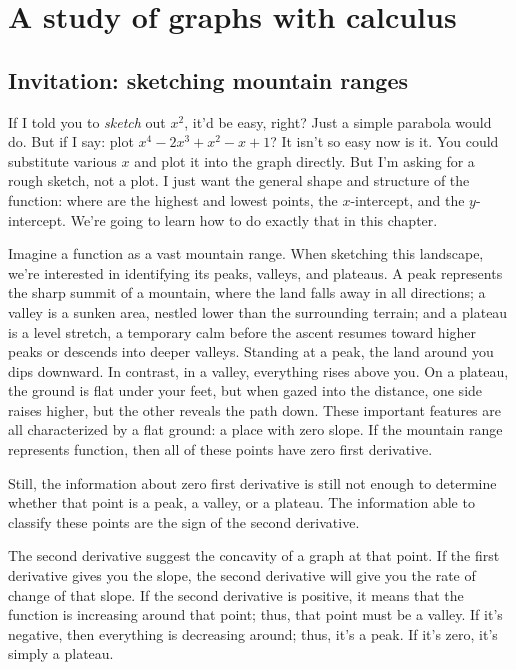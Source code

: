 \chapter{A study of graphs with calculus}

\section{Invitation: sketching mountain ranges}

If I told you to \emph{sketch} out $x^2$, it'd be easy, right? Just a simple parabola would do. But if I say: plot $x^4 - 2x^3 + x^2 - x + 1$? It isn't so easy now is it. You could substitute various $x$ and plot it into the graph directly. But I'm asking for a rough sketch, not a plot. I just want the general shape and structure of the function: where are the highest and lowest points, the $x$-intercept, and the $y$-intercept. We're going to learn how to do exactly that in this chapter.

Imagine a function as a vast mountain range. When sketching this landscape, we're interested in identifying its peaks, valleys, and plateaus. A peak represents the sharp summit of a mountain, where the land falls away in all directions; a valley is a sunken area, nestled lower than the surrounding terrain; and a plateau is a level stretch, a temporary calm before the ascent resumes toward higher peaks or descends into deeper valleys. Standing at a peak, the land around you dips downward. In contrast, in a valley, everything rises above you. On a plateau, the ground is flat under your feet, but when gazed into the distance, one side raises higher, but the other reveals the path down. These important features are all characterized by a flat ground: a place with zero slope. If the mountain range represents function, then all of these points have zero first derivative.

Still, the information about zero first derivative is still not enough to determine whether that point is a peak, a valley, or a plateau. The information able to classify these points are the sign of the second derivative.

The second derivative suggest the concavity of a graph at that point. If the first derivative gives you the slope, the second derivative will give you the rate of change of that slope. If the second derivative is positive, it means that the function is increasing around that point; thus, that point must be a valley. If it's negative, then everything is decreasing around; thus, it's a peak. If it's zero, it's simply a plateau.

